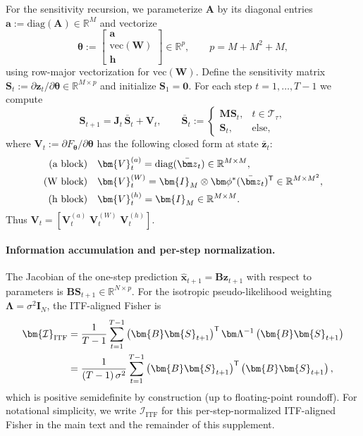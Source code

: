 \documentclass[twoside]{article}
\theoremstyle{plain}
\theoremstyle{definition}
\theoremstyle{remark}
\begin{document}
For the sensitivity recursion, we parameterize $\bm A$ by its diagonal entries $\bm a:=\mathrm{diag}(\bm A)\in\mathbb R^M$ and vectorize
\begin{equation}
\bm\theta := \begin{bmatrix}\bm a\\ \mathrm{vec}(\bm{W})\\ \bm{h}\end{bmatrix}\in\mathbb{R}^{p},
\qquad p=M+M^2+M,
\end{equation}
using row-major vectorization for $\mathrm{vec}(\bm{W})$. Define the sensitivity matrix $\bm{S}_t := \partial \bm{z}_t/\partial \bm\theta\in\mathbb{R}^{M\times p}$ and initialize $\bm{S}_1=\bm{0}$. For each step $t=1,\dots,T-1$ we compute
\begin{equation}
\bm{S}_{t+1} = \bm{J}_t\,\bar{\bm S}_t + \bm{V}_t,
\qquad
\bar{\bm S}_t:=\begin{cases}\bm M\bm S_t,& t\in\mathcal T_\tau,\\ \bm S_t,&\text{else,}\end{cases}
\end{equation}
where $\bm{V}_t:=\partial F_{\bm \theta}/\partial \bm\theta$ has the following closed form at state $\bar{\bm z}_t$:
\begin{align}
\text{(a block)}\quad & \bm{V}_t^{(a)} = \mathrm{diag}(\bar{\bm z}_t)\in\mathbb{R}^{M\times M},
\notag\\
\text{(W block)}\quad & \bm{V}_t^{(W)} = \bm{I}_M\otimes \bm\phi^\ast(\bar{\bm z}_t)^{\mathsf T}\in\mathbb{R}^{M\times M^2},
\notag\\
\text{(h block)}\quad & \bm{V}_t^{(h)} = \bm{I}_M\in\mathbb{R}^{M\times M}.
\end{align}
Thus $\bm{V}_t=[\bm{V}_t^{(a)}\;\bm{V}_t^{(W)}\;\bm{V}_t^{(h)}]$.

\paragraph{Information accumulation and per-step normalization.}
The Jacobian of the one-step prediction $\hat{\bm{x}}_{t+1}=\bm B\bm z_{t+1}$ with respect to parameters is $\bm{B}\bm{S}_{t+1}\in\mathbb{R}^{N\times p}$. For the isotropic pseudo-likelihood weighting $\bm\Lambda=\sigma^2\bm I_N$, the ITF-aligned Fisher is
\begin{align}
\bm{\mathcal{I}}_{\mathrm{ITF}} 
&= \frac{1}{T-1}\sum_{t=1}^{T-1} \left(\bm{B}\bm{S}_{t+1}\right)^{\mathsf T}\bm\Lambda^{-1}\left(\bm{B}\bm{S}_{t+1}\right)\notag\\
&= \frac{1}{(T-1)\,\sigma^2}\sum_{t=1}^{T-1} \left(\bm{B}\bm{S}_{t+1}\right)^{\mathsf T}\left(\bm{B}\bm{S}_{t+1}\right),
\end{align}
which is positive semidefinite by construction (up to floating-point roundoff). For notational simplicity, we write $\bm{\mathcal{I}}_{\mathrm{ITF}}$ for this per-step-normalized ITF-aligned Fisher in the main text and the remainder of this supplement.
\end{document}
